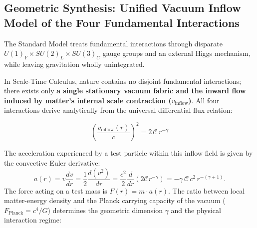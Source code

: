 \subsection{Geometric Synthesis: Unified Vacuum Inflow Model of the Four Fundamental Interactions}
\label{sec:buyuk_sentez_ana}

The Standard Model treats fundamental interactions through disparate $U(1)_Y \times SU(2)_L \times SU(3)_C$ gauge groups and an external Higgs mechanism, while leaving gravitation wholly unintegrated.

In Scale-Time Calculus, nature contains no disjoint fundamental interactions; there exists only \textbf{a single stationary vacuum fabric and the inward flow induced by matter's internal scale contraction ($v_{\mathrm{inflow}}$)}. All four interactions derive analytically from the universal differential flux relation:

\begin{equation}
    \boxed{ \left( \frac{v_{\mathrm{inflow}}(r)}{c} \right)^2 = 2 \, \mathcal{C} \, r^{-\gamma} }
    \label{eq:master_sentez_main}
\end{equation}

The acceleration experienced by a test particle within this inflow field is given by the convective Euler derivative:
\begin{equation}
    a(r) = v \frac{dv}{dr} = \frac{1}{2} \frac{d(v^2)}{dr} = \frac{c^2}{2} \frac{d}{dr}\left( 2\mathcal{C} r^{-\gamma} \right) = -\gamma \, \mathcal{C} \, c^2 \, r^{-(\gamma + 1)}.
    \label{eq:euler_ivme_main}
\end{equation}
The force acting on a test mass is $F(r) = m \cdot a(r)$. The ratio between local matter-energy density and the Planck carrying capacity of the vacuum ($F_{\mathrm{Planck}} = c^4/G$) determines the geometric dimension $\gamma$ and the physical interaction regime:

